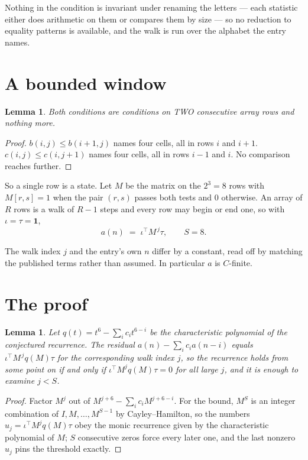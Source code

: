 \documentclass[11pt,a4paper]{article}
\theoremstyle{plain}
\newtheorem{lemma}[theorem]{Lemma}
\theoremstyle{definition}
\begin{document}
Nothing in the condition is invariant under renaming the letters --- each statistic either does
arithmetic on them or compares them by size --- so no reduction to equality patterns is
available, and the walk is run over the alphabet the entry names.

\section{A bounded window}

\begin{lemma}\label{lem:win}
Both conditions are conditions on TWO consecutive array rows and nothing more.
\end{lemma}

\begin{proof}
$b(i,j)\le b(i{+}1,j)$ names four cells, all in rows $i$ and $i+1$. $c(i,j)\le c(i,j{+}1)$
names four cells, all in rows $i-1$ and $i$. No comparison reaches further.
\end{proof}

So a single row is a state. Let $M$ be the matrix on the $2^{3}=8$ rows with
$M[r,s]=1$ when the pair $(r,s)$ passes both tests and $0$ otherwise. An array of $R$ rows is a
walk of $R-1$ steps and every row may begin or end one, so with $\iota=\tau=\mathbf{1}$,
\[
a(n)\;=\;\iota^{\!\top}M^{\,j}\tau ,\qquad S=8.
\]

The walk index $j$ and the entry's own $n$ differ by a constant, read off by matching the
published terms rather than assumed. In particular $a$ is $C$-finite.

\section{The proof}

\begin{lemma}\label{lem:crit}
Let $q(t)=t^{6}-\sum_i c_it^{6-i}$ be the characteristic polynomial of the
conjectured recurrence. The residual $a(n)-\sum_ic_ia(n-i)$ equals
$\iota^{\!\top}M^{\,j}q(M)\tau$ for the corresponding walk index $j$, so the recurrence
holds from some point on if and only if $\iota^{\!\top}M^{j}q(M)\tau=0$ for all large $j$,
and it is enough to examine $j<S$.
\end{lemma}

\begin{proof}
Factor $M^{j}$ out of $M^{j+6}-\sum_ic_iM^{j+6-i}$. For the bound, $M^{S}$
is an integer combination of $I,M,\dots,M^{S-1}$ by Cayley--Hamilton, so the numbers
$u_j=\iota^{\!\top}M^{j}q(M)\tau$ obey the monic recurrence given by the characteristic
polynomial of $M$; $S$ consecutive zeros force every later one, and the last nonzero $u_j$
pins the threshold exactly.
\end{proof}
\end{document}
